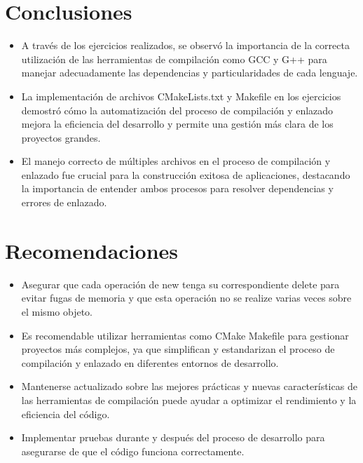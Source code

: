 \documentclass[]{article}
\begin{document}
\section{Conclusiones}
    \begin{itemize}
        \item A través de los ejercicios realizados, se observó la importancia de la correcta utilización de las herramientas de compilación como GCC y G++ para manejar adecuadamente las dependencias y particularidades de cada lenguaje.
        \item La implementación de archivos CMakeLists.txt y Makefile en los ejercicios demostró cómo la automatización del proceso de compilación y enlazado mejora la eficiencia del desarrollo y permite una gestión más clara de los proyectos grandes.
        \item El manejo correcto de múltiples archivos en el proceso de compilación y enlazado fue crucial para la construcción exitosa de aplicaciones, destacando la importancia de entender ambos procesos para resolver dependencias y errores de enlazado.
    \end{itemize}

\section{Recomendaciones}
    \begin{itemize}
		\item Asegurar que cada operación de new tenga su correspondiente
		delete para evitar fugas de memoria y que esta operación no
		se realize varias veces sobre el mismo objeto.
        \item  Es recomendable utilizar herramientas como CMake 
		Makefile para gestionar proyectos más complejos, ya que simplifican y 
		estandarizan el proceso de compilación y enlazado en diferentes
		entornos de desarrollo.
        \item Mantenerse actualizado sobre las mejores prácticas y 
		nuevas características de las herramientas de compilación 
		puede ayudar a optimizar el rendimiento y la eficiencia del 
		código.
        \item Implementar pruebas durante y después del proceso
		de desarrollo para asegurarse de que el código funciona 
		correctamente.
	\end{itemize}


\renewcommand{\listlistingname}{Indice Source Code}
\listoflistings
\addcontentsline{toc}{section}{\listlistingname}
\end{document}
